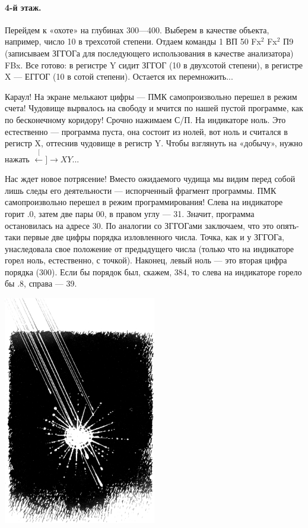 \documentclass[11pt,a4paper,oneside]{article}
\def\XY{$\stackrel[\leftarrow]{\rightarrow}{XY}$}
\begin{document}
\paragraph{4-й этаж.} Перейдем к «охоте» на глубинах 300—400. Выберем в качестве объекта, например, число 10 в трехсотой степени. Отдаем команды 1 ВП 50 Fx$^{2}$ Fx$^{2}$ П9 (записываем ЗГГОГа для последующего использования в качестве анализатора) FBx. Все готово: в регистре Y сидит ЗГГОГ (10 в двухсотой степени), в регистре X — ЕГГОГ (10 в сотой степени). Остается их перемножить...

Караул! На экране мелькают цифры — ПМК самопроизвольно перешел в режим счета! Чудовище вырвалось на свободу и мчится по нашей пустой программе, как по бесконечному коридору! Срочно нажимаем С/П. На индикаторе ноль. Это естественно — программа пуста, она состоит из нолей, вот ноль и считался в регистр X, оттеснив чудовище в регистр Y. Чтобы взглянуть на «добычу», нужно нажать \XY...

Нас ждет новое потрясение! Вместо ожидаемого чудища мы видим перед собой лишь следы его деятельности — испорченный фрагмент программы. ПМК самопроизвольно перешел в режим программирования! Слева на индикаторе горит .0, затем две пары 00, в правом углу — 31. Значит, программа остановилась на адресе 30. По аналогии со ЗГГОГами заключаем, что это опять-таки первые две цифры порядка изловленного числа. Точка, как и у ЗГГОГа, унаследовала свое положение от предыдущего числа (только что на индикаторе горел ноль, естественно, с точкой). Наконец, левый ноль — это вторая цифра порядка (300). Если бы порядок был, скажем, 384, то слева на индикаторе горело бы .8, справа — 39.

\includegraphics[width=0.5\textwidth]{darkness3}
\end{document}
